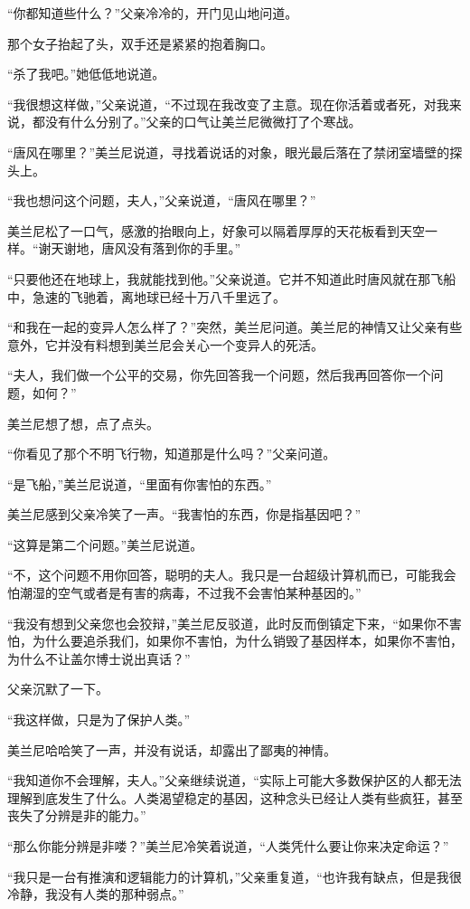 “你都知道些什么？”父亲冷冷的，开门见山地问道。

那个女子抬起了头，双手还是紧紧的抱着胸口。

“杀了我吧。”她低低地说道。

“我很想这样做，”父亲说道，“不过现在我改变了主意。现在你活着或者死，对我来说，都没有什么分别了。”父亲的口气让美兰尼微微打了个寒战。

“唐风在哪里？”美兰尼说道，寻找着说话的对象，眼光最后落在了禁闭室墙壁的探头上。

“我也想问这个问题，夫人，”父亲说道，“唐风在哪里？”

美兰尼松了一口气，感激的抬眼向上，好象可以隔着厚厚的天花板看到天空一样。“谢天谢地，唐风没有落到你的手里。”

“只要他还在地球上，我就能找到他。”父亲说道。它并不知道此时唐风就在那飞船中，急速的飞驰着，离地球已经十万八千里远了。

“和我在一起的变异人怎么样了？”突然，美兰尼问道。美兰尼的神情又让父亲有些意外，它并没有料想到美兰尼会关心一个变异人的死活。

“夫人，我们做一个公平的交易，你先回答我一个问题，然后我再回答你一个问题，如何？”

美兰尼想了想，点了点头。

“你看见了那个不明飞行物，知道那是什么吗？”父亲问道。

“是飞船，”美兰尼说道，“里面有你害怕的东西。”

美兰尼感到父亲冷笑了一声。“我害怕的东西，你是指基因吧？”

“这算是第二个问题。”美兰尼说道。

“不，这个问题不用你回答，聪明的夫人。我只是一台超级计算机而已，可能我会怕潮湿的空气或者是有害的病毒，不过我不会害怕某种基因的。”

“我没有想到父亲您也会狡辩，”美兰尼反驳道，此时反而倒镇定下来，“如果你不害怕，为什么要追杀我们，如果你不害怕，为什么销毁了基因样本，如果你不害怕，为什么不让盖尔博士说出真话？”

父亲沉默了一下。

“我这样做，只是为了保护人类。”

美兰尼哈哈笑了一声，并没有说话，却露出了鄙夷的神情。

“我知道你不会理解，夫人。”父亲继续说道，“实际上可能大多数保护区的人都无法理解到底发生了什么。人类渴望稳定的基因，这种念头已经让人类有些疯狂，甚至丧失了分辨是非的能力。”

“那么你能分辨是非喽？”美兰尼冷笑着说道，“人类凭什么要让你来决定命运？”

“我只是一台有推演和逻辑能力的计算机，”父亲重复道，“也许我有缺点，但是我很冷静，我没有人类的那种弱点。”

